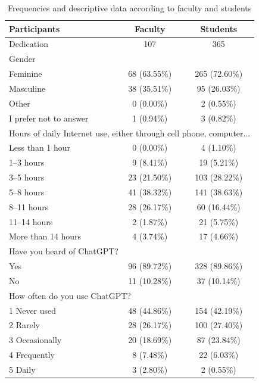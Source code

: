 \documentclass[english]{textolivre}
\begin{document}
\begin{table}[htbp]
\centering
\caption{Frequencies and descriptive data according to faculty and students}
\label{tab:frequencies}
\footnotesize
\setlength{\tabcolsep}{6pt}

\begin{tabular}{lcc}
\toprule
Participants &
Faculty &
Students \\
\midrule
Dedication & 107 & 365 \\
\midrule

\multicolumn{3}{l}{Gender} \\
Feminine & 68 (63.55\%) & 265 (72.60\%) \\
Masculine & 38 (35.51\%) & 95 (26.03\%) \\
Other & 0 (0.00\%) & 2 (0.55\%) \\
I prefer not to answer & 1 (0.94\%) & 3 (0.82\%) \\
\midrule

\multicolumn{3}{l}{Hours of daily Internet use, either through cell phone, computer...} \\
Less than 1 hour & 0 (0.00\%) & 4 (1.10\%) \\
1--3 hours & 9 (8.41\%) & 19 (5.21\%) \\
3--5 hours & 23 (21.50\%) & 103 (28.22\%) \\
5--8 hours & 41 (38.32\%) & 141 (38.63\%) \\
8--11 hours & 28 (26.17\%) & 60 (16.44\%) \\
11--14 hours & 2 (1.87\%) & 21 (5.75\%) \\
More than 14 hours & 4 (3.74\%) & 17 (4.66\%) \\
\midrule

\multicolumn{3}{l}{Have you heard of ChatGPT?} \\
Yes & 96 (89.72\%) & 328 (89.86\%) \\
No & 11 (10.28\%) & 37 (10.14\%) \\
\midrule

\multicolumn{3}{l}{How often do you use ChatGPT?} \\
1 Never used & 48 (44.86\%) & 154 (42.19\%) \\
2 Rarely & 28 (26.17\%) & 100 (27.40\%) \\
3 Occasionally & 20 (18.69\%) & 87 (23.84\%) \\
4 Frequently & 8 (7.48\%) & 22 (6.03\%) \\
5 Daily & 3 (2.80\%) & 2 (0.55\%) \\
\midrule


\end{tabular}
\end{table}
\end{document}

